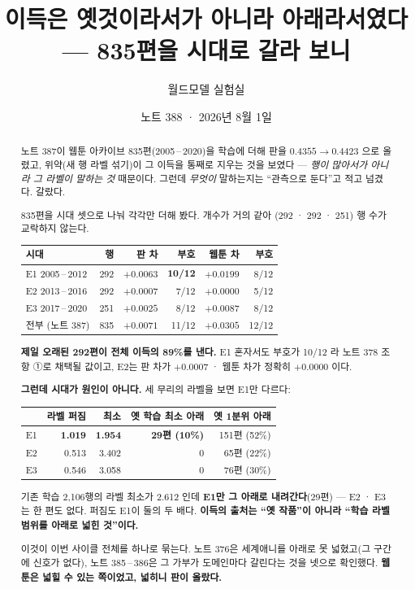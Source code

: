 \documentclass[11pt]{article}
\begin{document}
\title{이득은 옛것이라서가 아니라 아래라서였다 --- 835편을 시대로 갈라 보니}
\author{월드모델 실험실}
\date{노트 388 · 2026년 8월 1일}
\maketitle

\begin{abstract}
노트 387이 웹툰 아카이브 835편(2005\,--\,2020)을 학습에 더해 판을
$0.4355 \to 0.4423$ 으로 올렸고, 위약(새 행 라벨 섞기)이 그 이득을 통째로
지우는 것을 보였다 --- \emph{행이 많아서가 아니라 그 라벨이 말하는 것}
때문이다. 그런데 \emph{무엇이} 말하는지는 ``관측으로 둔다''고 적고 넘겼다.
갈랐다.

835편을 시대 셋으로 나눠 각각만 더해 봤다. 개수가 거의 같아
(292 · 292 · 251) 행 수가 교락하지 않는다.

\begin{center}
\begin{tabular}{lrrrrr}
\hline
시대 & 행 & 판 차 & 부호 & 웹툰 차 & 부호 \\
\hline
E1 2005\,--\,2012 & 292 & $\mathbf{+0.0063}$ & \textbf{10/12} & $+0.0199$ & 8/12 \\
E2 2013\,--\,2016 & 292 & $+0.0007$ & 7/12 & $+0.0000$ & 5/12 \\
E3 2017\,--\,2020 & 251 & $+0.0025$ & 8/12 & $+0.0087$ & 8/12 \\
\hline
전부 (노트 387) & 835 & $+0.0071$ & 11/12 & $+0.0305$ & 12/12 \\
\hline
\end{tabular}
\end{center}

\textbf{제일 오래된 292편이 전체 이득의 89\%를 낸다.} E1 혼자서도 부호가
10/12 라 노트 378 조항 ①로 채택될 값이고, E2는 판 차가 $+0.0007$ ·
웹툰 차가 정확히 $+0.0000$ 이다.

\textbf{그런데 시대가 원인이 아니다.} 세 무리의 라벨을 보면 E1만 다르다:

\begin{center}
\begin{tabular}{lrrrr}
\hline
 & 라벨 퍼짐 & 최소 & 옛 학습 최소 아래 & 옛 1분위 아래 \\
\hline
E1 & \textbf{1.019} & \textbf{1.954} & \textbf{29편 (10\%)} & 151편 (52\%) \\
E2 & 0.513 & 3.402 & 0 & 65편 (22\%) \\
E3 & 0.546 & 3.058 & 0 & 76편 (30\%) \\
\hline
\end{tabular}
\end{center}

기존 학습 2,106행의 라벨 최소가 2.612 인데 \textbf{E1만 그 아래로
내려간다}(29편) --- E2 · E3는 한 편도 없다. 퍼짐도 E1이 둘의 두 배다.
\textbf{이득의 출처는 ``옛 작품''이 아니라 ``학습 라벨 범위를 아래로
넓힌 것''이다.}

이것이 이번 사이클 전체를 하나로 묶는다. 노트 376은 세계애니를 아래로
못 넓혔고(그 구간에 신호가 없다), 노트 385\,--\,386은 그 가부가 도메인마다
갈린다는 것을 넷으로 확인했다. \textbf{웹툰은 넓힐 수 있는 쪽이었고, 넓히니
판이 올랐다.}
\end{abstract}
\end{document}

